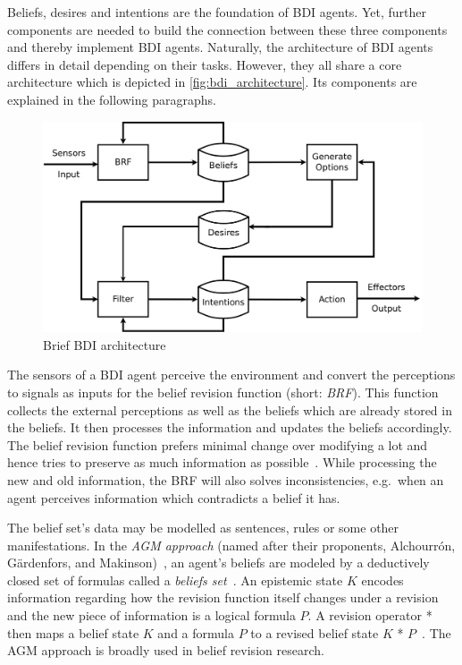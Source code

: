 Beliefs, desires and intentions are the foundation of BDI agents.
Yet, further components are needed to build the connection between these three components and thereby implement BDI agents.
Naturally, the architecture of BDI agents differs in detail depending on their tasks.
However, they all share a core architecture which is depicted in \autoref{fig:bdi_architecture}.
Its components are explained in the following paragraphs.
\begin{figure}[htbp]
  \centering
  \includegraphics[width=\textwidth]{images/BDIAr}
  \caption{Brief BDI architecture~\cite{BDIA}}
  \label{fig:bdi_architecture}
\end{figure}

The sensors of a BDI agent perceive the environment and convert the perceptions to signals as inputs for the belief revision function (short: \emph{BRF}).
This function collects the external perceptions as well as the beliefs which are already stored in the beliefs.
It then processes the information and updates the beliefs accordingly.
The belief revision function prefers minimal change over modifying a lot and hence tries to preserve as much information as possible~\cite{Antje_SpatialBelief_2011}.
While processing the new and old information, the BRF will also solves inconsistencies, e.g.\ when an agent perceives information which contradicts a belief it has.

The belief set's data may be modelled as sentences, rules or some other manifestations.
In the \emph{AGM approach} (named after their proponents, Alchourrón, Gärdenfors, and Makinson)~\cite{alchourron_revision_1985}, an agent's beliefs are modeled by a deductively closed set of formulas called a \emph{beliefs set}~\cite{James_revise_2011}.
An epistemic state $K$ encodes information regarding how the revision function itself changes under a revision and the new piece of information is a logical formula $P$.
A revision operator * then maps a belief state $K$ and a formula $P$ to a revised belief state $K$ * $P$~\cite{James_revise_2011}.
The AGM approach is broadly used in belief revision research.

